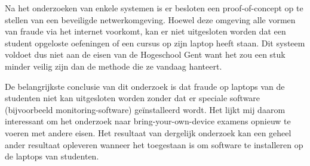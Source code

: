 Na het onderzoeken van enkele systemen is er besloten een proof-of-concept op te stellen van een beveiligde netwerkomgeving. Hoewel deze omgeving alle vormen van fraude via het internet voorkomt, kan er niet uitgesloten worden dat een student opgeloste oefeningen of een cursus op zijn laptop heeft staan. Dit systeem voldoet dus niet aan de eisen van de Hogeschool Gent want het zou een stuk minder veilig zijn dan de methode die ze vandaag hanteert. 

De belangrijkste conclusie van dit onderzoek is dat fraude op laptops van de studenten niet kan uitgesloten worden zonder dat er speciale software (bijvoorbeeld monitoring-software) ge\"{i}nstalleerd wordt. Het lijkt mij daarom interessant om het onderzoek naar bring-your-own-device examens opnieuw te voeren met andere eisen. Het resultaat van dergelijk onderzoek kan een geheel ander resultaat opleveren wanneer het toegestaan is om software te installeren op de laptops van studenten. 
